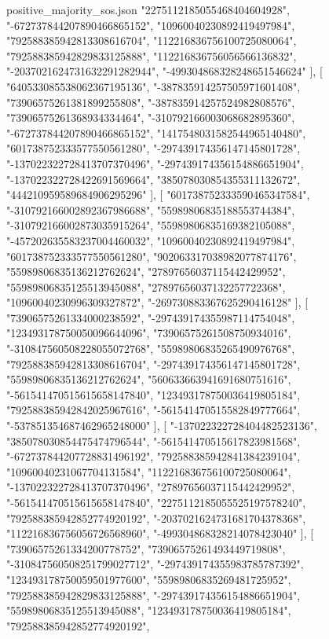 \begin{filecontents*}[overwrite]{positive_majority_sos.json}
    "2275112185055468404604928",
    "-672737844207890466865152",
    "10960040230892419497984",
    "792588385942813308616704",
    "112216836756100725080064",
    "792588385942829833125888",
    "112216836756056566136832",
    "-2037021624731632291282944",
    "-499304868328248651546624"
   ],
   [
    "640533085538062367195136",
    "-387835914257505971601408",
    "73906575261381899255808",
    "-387835914257524982808576",
    "73906575261368934334464",
    "-310792166003068682895360",
    "-672737844207890466865152",
    "1417548031582544965140480",
    "601738752333577550561280",
    "-297439174356147145801728",
    "-137022322728413707370496",
    "-297439174356154886651904",
    "-137022322728422691569664",
    "385078030854355311132672",
    "444210959589684906295296"
   ],
   [
    "601738752333590465347584",
    "-310792166002892367986688",
    "55989806835188553744384",
    "-310792166002873035915264",
    "55989806835169382105088",
    "-457202635583237004460032",
    "10960040230892419497984",
    "601738752333577550561280",
    "902063317038982077874176",
    "55989806835136212762624",
    "27897656037115442429952",
    "55989806835125513945088",
    "27897656037132257722368",
    "10960040230996309327872",
    "-269730883367625290416128"
   ],
   [
    "73906575261334000238592",
    "-297439174355987114754048",
    "123493178750050096644096",
    "73906575261508750934016",
    "-310847560508228055072768",
    "55989806835265490976768",
    "792588385942813308616704",
    "-297439174356147145801728",
    "55989806835136212762624",
    "560633663941691680751616",
    "-561541470515615658147840",
    "123493178750036419805184",
    "792588385942842025967616",
    "-561541470515582849777664",
    "-537851354687462965248000"
   ],
   [
    "-137022322728404482523136",
    "385078030854475474796544",
    "-561541470515617823981568",
    "-672737844207728831496192",
    "792588385942841384239104",
    "10960040231067704131584",
    "112216836756100725080064",
    "-137022322728413707370496",
    "27897656037115442429952",
    "-561541470515615658147840",
    "2275112185055525197578240",
    "792588385942852774920192",
    "-2037021624731681704378368",
    "112216836756056726568960",
    "-499304868328214078423040"
   ],
   [
    "73906575261334200778752",
    "73906575261493449719808",
    "-310847560508251799027712",
    "-297439174355983785787392",
    "123493178750059501977600",
    "55989806835269481725952",
    "792588385942829833125888",
    "-297439174356154886651904",
    "55989806835125513945088",
    "123493178750036419805184",
    "792588385942852774920192",

\end{filecontents*}
